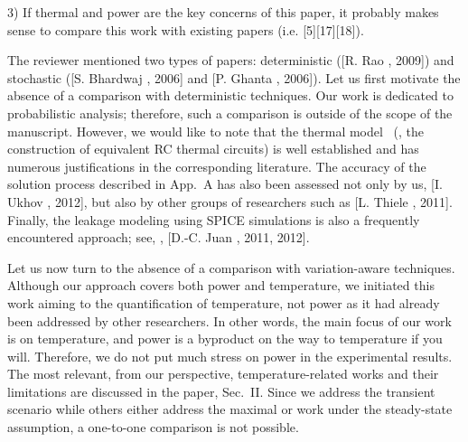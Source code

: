 \begin{reviewer}
3) If thermal and power are the key concerns of this paper, it probably makes sense to compare this work with existing papers (i.e. [5][17][18]).
\end{reviewer}
\begin{authors}
The reviewer mentioned two types of papers: deterministic ([R. Rao \etal, 2009]) and stochastic ([S. Bhardwaj \etal, 2006] and [P. Ghanta \etal, 2006]).
Let us first motivate the absence of a comparison with deterministic techniques.
Our work is dedicated to probabilistic analysis; therefore, such a comparison is outside of the scope of the manuscript.
However, we would like to note that the thermal model \perse\ (\ie, the construction of equivalent RC thermal circuits) is well established and has numerous justifications in the corresponding literature.
The accuracy of the solution process described in App.~A has also been assessed not only by us, [I. Ukhov \etal, 2012], but also by other groups of researchers such as [L. Thiele \etal, 2011].
Finally, the leakage modeling using SPICE simulations is also a frequently encountered approach; see, \eg, [D.-C. Juan \etal, 2011, 2012].

Let us now turn to the absence of a comparison with variation-aware techniques.
Although our approach covers both power and temperature, we initiated this work aiming to the quantification of temperature, not power as it had already been addressed by other researchers.
In other words, the main focus of our work is on temperature, and power is a byproduct on the way to temperature if you will.
Therefore, we do not put much stress on power in the experimental results.
The most relevant, from our perspective, temperature-related works and their limitations are discussed in the paper, Sec.~II.
Since we address the transient scenario while others either address the maximal or work under the steady-state assumption, a one-to-one comparison is not possible.

\end{authors}
